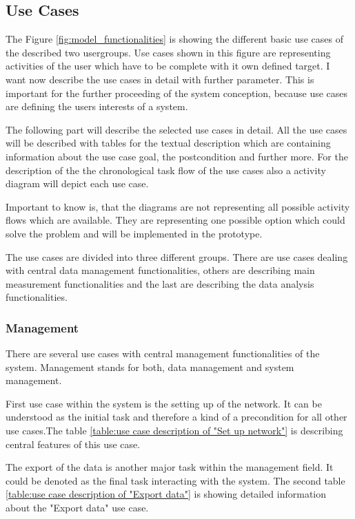 \subsection{Use Cases}
The Figure \ref{fig:model_functionalities} is showing the different basic use cases of the described two usergroups. Use cases shown in this figure are representing activities of the user which have to be complete with it own defined target. I want now describe the use cases in detail with further parameter. This is important for the further proceeding of the system conception, because use cases are defining the users interests of a system.

The following part will describe the selected use cases in detail. All the use cases will be described with tables for the textual description which are containing information about the use case goal, the postcondition and further more. For the description of the the chronological task flow of the use cases also a activity diagram will depict each use case.

Important to know is, that the diagrams are not representing all possible activity flows which are available. They are representing one possible option which could solve the problem and will be implemented in the prototype.

The use cases are divided into three different groups. There are use cases dealing with central data management functionalities, others are describing main measurement functionalities and the last are describing the data analysis functionalities.


\subsubsection{Management}
There are several use cases with central management functionalities of the system. Management stands for both, data management and system management.  

First use case within the system is the setting up of the network. It can be understood as the initial task and therefore a kind of a precondition for all other use cases.The table \ref{table:use case description of "Set up network"} is describing central features of this use case. 

The export of the data is another major task within the management field. It could be denoted as the final task interacting with the system. The second table \ref{table:use case description of "Export data"} is showing detailed information about the "Export data" use case.


